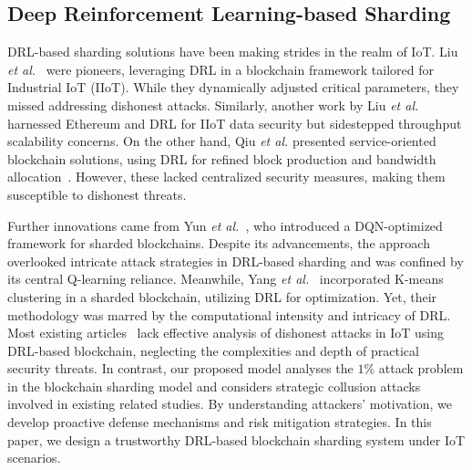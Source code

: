 \subsection{Deep Reinforcement Learning-based Sharding}
DRL-based sharding solutions have been making strides in the realm of IoT. Liu \textit{et al.}~\cite{liu2019performance} were pioneers, leveraging DRL in a blockchain framework tailored for Industrial IoT (IIoT). While they dynamically adjusted critical parameters, they missed addressing dishonest attacks. Similarly, another work by Liu \textit{et al.}~\cite{liu2018blockchain} harnessed Ethereum and DRL for IIoT data security but sidestepped throughput scalability concerns. On the other hand, Qiu \textit{et al.} presented service-oriented blockchain solutions, using DRL for refined block production and bandwidth allocation~\cite{qiu2019service,qiu2018blockchain}. However, these lacked centralized security measures, making them susceptible to dishonest threats.

Further innovations came from Yun \textit{et al.}~\cite{yun2020dqn}, who introduced a DQN-optimized framework for sharded blockchains. Despite its advancements, the approach overlooked intricate attack strategies in DRL-based sharding and was confined by its central Q-learning reliance. Meanwhile, Yang \textit{et al.}~\cite{yang2022sharded} incorporated K-means clustering in a sharded blockchain, utilizing DRL for optimization. Yet, their methodology was marred by the computational intensity and intricacy of DRL.
Most existing articles~\cite{liu2019performance, liu2018blockchain, qiu2019service, qiu2018blockchain} lack effective analysis of dishonest attacks in IoT using DRL-based blockchain, neglecting the complexities and depth of practical security threats. In contrast, our proposed model analyses the $1\%$ attack problem in the blockchain sharding model and considers strategic collusion attacks involved in existing related studies. By understanding attackers' motivation, we develop proactive defense mechanisms and risk mitigation strategies. In this paper, we design a trustworthy DRL-based blockchain sharding system under IoT scenarios. 




